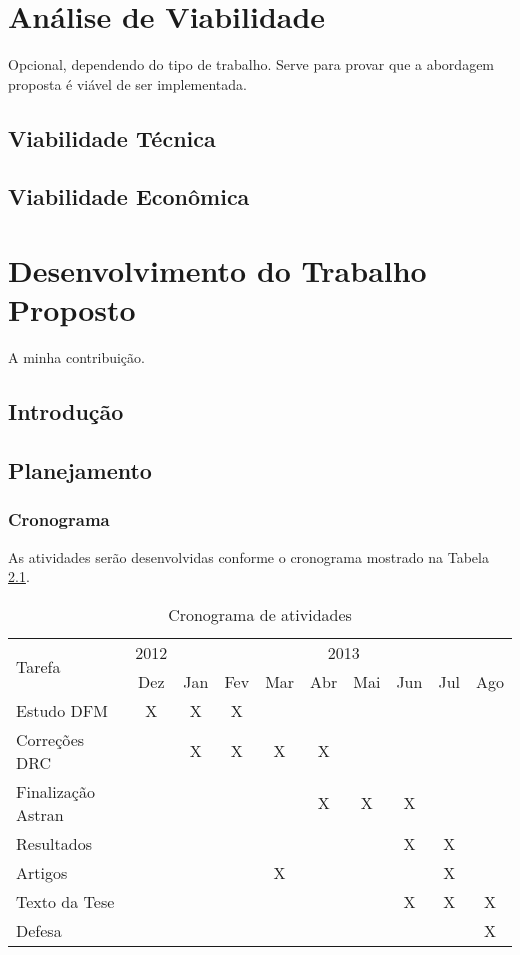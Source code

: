 \documentclass[openright]{ifrs} %
\begin{document}
\chapter{Análise de Viabilidade} 
Opcional, dependendo do tipo de trabalho. Serve para provar que a abordagem proposta é viável de ser implementada.
\section{Viabilidade Técnica}
\section{Viabilidade Econômica}

\chapter{Desenvolvimento do Trabalho Proposto}
A minha contribuição.
\section{Introdução}
\section{Planejamento}
\subsection{Cronograma}
As atividades serão desenvolvidas conforme o cronograma mostrado na Tabela \ref{cronograma}.

\begin{table}
\caption{Cronograma de atividades}
\begin{center}
\begin{tabular}{l|c|c|c|c|c|c|c|c|c}
\hline \multirow{2}{*}{Tarefa}& 2012& \multicolumn{8}{c}{2013}\\
          	             & Dez & Jan & Fev & Mar & Abr & Mai & Jun & Jul & Ago \\
\hline
\hline Estudo DFM        &  X  &  X  &  X  &     &     &     &     &     &     \\
\hline Correções DRC     &     &  X  &  X  &  X  &  X  &     &     &     &     \\
\hline Finalização Astran&     &     &     &     &  X  &  X  &  X  &     &     \\
\hline Resultados        &     &     &     &     &     &     &  X  &  X  &     \\
\hline Artigos           &     &     &     &  X  &     &     &     &  X  &     \\
\hline Texto da Tese     &     &     &     &     &     &     &  X  &  X  &  X  \\
\hline Defesa	         &     &     &     &     &     &     &     &     &  X  \\
\hline 
\end{tabular}
\end{center}
\label{cronograma}
\end{table}
\end{document}
